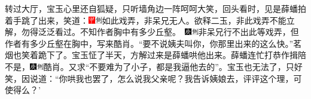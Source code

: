 转过大厅，宝玉心里还自狐疑，只听墙角边一阵呵呵大笑，回头看时，见是薛蟠拍着手跳了出来，笑道：{\includegraphics[width=3mm]{../Images/00002}\includegraphics[width=3mm]{../Images/00011}\footnotesize \kaishu 如此戏弄，非呆兄无人。欲释二玉，非此戏弄不能立解，勿得泛泛看过。不知作者胸中有多少丘壑。　\includegraphics[width=3mm]{../Images/00004}\includegraphics[width=3mm]{../Images/00011}\footnotesize \kaishu 非呆兄行不出此等戏弄，但作者有多少丘壑在胸中，写来酷肖。}``要不说姨夫叫你，你那里出来的这么快。''茗烟也笑着跪下了。宝玉怔了半天，方解过来是薛蟠哄他出来。薛蟠连忙打恭作揖陪不是，{\includegraphics[width=3mm]{../Images/00004}\includegraphics[width=3mm]{../Images/00011}\footnotesize \kaishu 酷肖。}又求``不要难为了小子，都是我逼他去的''。宝玉也无法了，只好笑，因说道：``你哄我也罢了，怎么说我父亲呢？我告诉姨娘去，评评这个理，可使得么？'